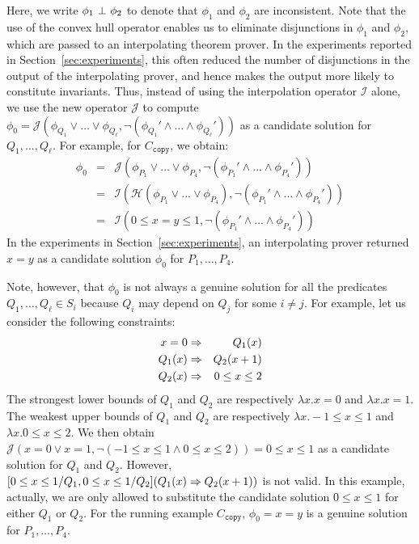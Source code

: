 Here, we write \(\phi_1 \ \bot\  \phi_2\) to denote that \(\phi_1\) and 
\(\phi_2\) are inconsistent.  Note that the use of the convex hull 
operator enables us to eliminate disjunctions in \(\phi_1\) and 
\(\phi_2\), which are passed to an interpolating theorem prover.
In the experiments reported in Section~\ref{sec:experiments}, this often 
reduced the number of disjunctions in the output of the interpolating 
prover, and hence makes the output more likely to constitute invariants.
%
Thus, instead of using the interpolation operator \(\mathcal{I}\) alone, 
we use the new operator \(\mathcal{J}\) to compute \(\phi_0 = 
\mathcal{J}(\phi_{Q_1} \lor \dots \lor \phi_{Q_{\ell}},\neg (\phi_{Q_1}' 
\land \dots \land \phi_{Q_{\ell}}'))\) as a candidate solution for 
\(Q_1,\dots,Q_{\ell}\).  For example, for \(C_{\texttt{copy}}\), we obtain:
\begin{eqnarray*}
\phi_0 &=& \mathcal{J}(\phi_{P_1} \lor \dots \lor \phi_{P_4},\neg (\phi_{P_1}' \land \dots \land \phi_{P_4}')) \\
&=& \mathcal{I}(\mathcal{H}(\phi_{P_1} \lor \dots \lor \phi_{P_4}),\neg (\phi_{P_1}' \land \dots \land \phi_{P_4}')) \\
&=& \mathcal{I}(0 \leq x=y \leq 1,\neg (\phi_{P_1}' \land \dots \land \phi_{P_4}'))
\end{eqnarray*}
In the experiments in Section~\ref{sec:experiments}, an interpolating 
prover returned \(x=y\) as a candidate solution \(\phi_0\) for 
\(P_1,\dots,P_4\).

Note, however, that \(\phi_0\) is not always a genuine solution for all 
the predicates \(Q_1,\dots,Q_{\ell} \in S_i\) because \(Q_i\) may depend 
on \(Q_j\) for some \(i \neq j\).  For example, let us consider the 
following constraints:
\begin{eqnarray*}
x=0 &\Rightarrow& Q_1(x) \\
Q_1(x) &\Rightarrow& Q_2(x+1) \\
Q_2(x) &\Rightarrow& 0 \leq x \leq 2
\end{eqnarray*}
The strongest lower bounds of \(Q_1\) and \(Q_2\) are respectively 
\(\lambda x.x=0\) and \(\lambda x.x=1\).  The weakest upper bounds of 
\(Q_1\) and \(Q_2\) are respectively \(\lambda x.-1 \leq x \leq 1\) and 
\(\lambda x.0 \leq x \leq 2\).  We then obtain \(\mathcal{J}(x=0 \lor 
x=1,\neg (-1 \leq x \leq 1 \land 0 \leq x \leq 2))=0 \leq x \leq 1\) as 
a candidate solution for \(Q_1\) and \(Q_2\).  However, \([0 \leq x \leq 
1/Q_1,0 \leq x \leq 1/Q_2](Q_1(x) \Rightarrow Q_2(x+1))\) is not valid.  In 
this example, actually, we are only allowed to substitute the candidate 
solution \(0 \leq x \leq 1\) for either \(Q_1\) or \(Q_2\).  For the 
running example \(C_{\texttt{copy}}\), \(\phi_0 = x=y\) is a genuine 
solution for \(P_1,\dots,P_4\).



